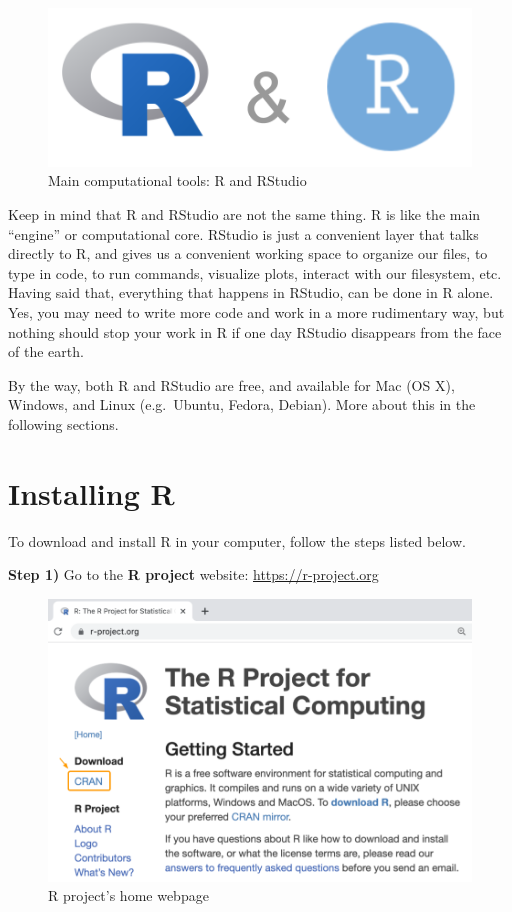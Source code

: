 \documentclass[
]{book}
\begin{document}
\begin{figure}

{\centering \includegraphics[width=0.3\linewidth]{images/rstudio/r-rstudio-logos} 

}

\caption{Main computational tools: R and RStudio}\label{fig:unnamed-chunk-5}
\end{figure}

Keep in mind that R and RStudio are not the same thing. R is like the main\\
``engine'' or computational core. RStudio is just a convenient layer that
talks directly to R, and gives us a convenient working space to organize our
files, to type in code, to run commands, visualize plots, interact with our
filesystem, etc. Having said that, everything that happens in RStudio, can
be done in R alone. Yes, you may need to write more code and work in a more
rudimentary way, but nothing should stop your work in R if one day RStudio
disappears from the face of the earth.

By the way, both R and RStudio are free, and available for Mac (OS X), Windows,
and Linux (e.g.~Ubuntu, Fedora, Debian). More about this in the following
sections.

\hypertarget{installing-r-1}{%
\section{Installing R}\label{installing-r-1}}

To download and install R in your computer, follow the steps listed below.

\textbf{Step 1)} Go to the \textbf{R project} website: \url{https://r-project.org}

\begin{figure}

{\centering \includegraphics[width=0.7\linewidth]{images/install/r-project} 

}

\caption{R project's home webpage}\label{fig:unnamed-chunk-6}
\end{figure}
\end{document}
